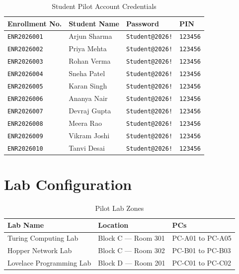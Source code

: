 \begin{table}[h!]
\centering
\caption{Student Pilot Account Credentials}
\begin{tabularx}{\textwidth}{lXll}
\toprule
\textbf{Enrollment No.} & \textbf{Student Name} & \textbf{Password} & \textbf{PIN}\\
\midrule
\rowcolor{aurxonlightgray}
\texttt{ENR2026001} & Arjun Sharma & \texttt{Student@2026!} & \texttt{123456}\\
\texttt{ENR2026002} & Priya Mehta & \texttt{Student@2026!} & \texttt{123456}\\
\rowcolor{aurxonlightgray}
\texttt{ENR2026003} & Rohan Verma & \texttt{Student@2026!} & \texttt{123456}\\
\texttt{ENR2026004} & Sneha Patel & \texttt{Student@2026!} & \texttt{123456}\\
\rowcolor{aurxonlightgray}
\texttt{ENR2026005} & Karan Singh & \texttt{Student@2026!} & \texttt{123456}\\
\texttt{ENR2026006} & Ananya Nair & \texttt{Student@2026!} & \texttt{123456}\\
\rowcolor{aurxonlightgray}
\texttt{ENR2026007} & Devraj Gupta & \texttt{Student@2026!} & \texttt{123456}\\
\texttt{ENR2026008} & Meera Rao & \texttt{Student@2026!} & \texttt{123456}\\
\rowcolor{aurxonlightgray}
\texttt{ENR2026009} & Vikram Joshi & \texttt{Student@2026!} & \texttt{123456}\\
\texttt{ENR2026010} & Tanvi Desai & \texttt{Student@2026!} & \texttt{123456}\\
\bottomrule
\end{tabularx}
\end{table}

\section{Lab Configuration}

\begin{table}[h!]
\centering
\caption{Pilot Lab Zones}
\begin{tabularx}{\textwidth}{lXl}
\toprule
\textbf{Lab Name} & \textbf{Location} & \textbf{PCs}\\
\midrule
Turing Computing Lab & Block C — Room 301 & PC-A01 to PC-A05\\
\rowcolor{aurxonlightgray}
Hopper Network Lab & Block C — Room 302 & PC-B01 to PC-B03\\
Lovelace Programming Lab & Block D — Room 201 & PC-C01 to PC-C02\\
\bottomrule
\end{tabularx}
\end{table}

